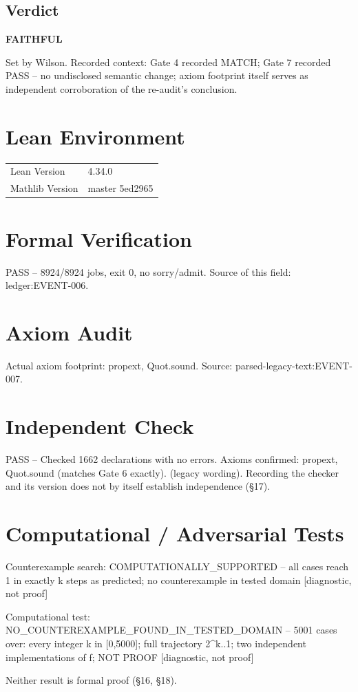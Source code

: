 \documentclass[11pt]{article}
\begin{document}
\subsection*{Verdict}
\noindent\textbf{FAITHFUL}\par Set by Wilson. Recorded context: Gate 4 recorded MATCH; Gate 7 recorded PASS -- no undisclosed semantic change; axiom footprint itself serves as independent corroboration of the re-audit's conclusion.
\section{Lean Environment}
\begin{tabular}{@{}ll@{}}
\toprule
Lean Version & 4.34.0 \\
Mathlib Version & master 5ed2965 \\
\bottomrule
\end{tabular}
\section{Formal Verification}
PASS -- 8924/8924 jobs, exit 0, no sorry/admit.
Source of this field: ledger:EVENT-006.
\section{Axiom Audit}
Actual axiom footprint: propext, Quot.sound.
Source: parsed-legacy-text:EVENT-007.
\section{Independent Check}
PASS -- Checked 1662 declarations with no errors. Axioms confirmed: propext, Quot.sound (matches Gate 6 exactly).  (legacy wording).
Recording the checker and its version does not by itself establish independence (\S{}17).
\section{Computational / Adversarial Tests}
Counterexample search: COMPUTATIONALLY\_SUPPORTED -- all cases reach 1 in exactly k steps as predicted; no counterexample in tested domain [diagnostic, not proof]

Computational test: NO\_COUNTEREXAMPLE\_FOUND\_IN\_TESTED\_DOMAIN -- 5001 cases over: every integer k in [0,5000]; full trajectory 2\textasciicircum{}k..1; two independent implementations of f; NOT PROOF [diagnostic, not proof]

Neither result is formal proof (\S{}16, \S{}18).
\end{document}
